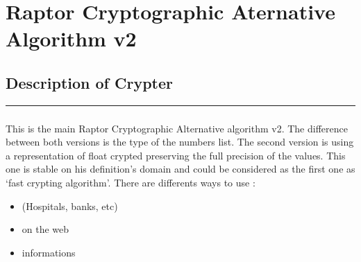 \documentclass[letterpaper,10pt,english]{sphinxmanual}
\begin{document}
\chapter{Raptor Cryptographic Aternative Algorithm v2}
\label{\detokenize{alternativev2:raptor-cryptographic-aternative-algorithm-v2}}\label{\detokenize{alternativev2::doc}}
\newpage
\section{Description of Crypter}
\label{\detokenize{Description of AltCrypterv2:description-of-crypter}}\label{\detokenize{Description of AltCrypterv2::doc}}
\sphinxAtStartPar
{}


\bigskip\hrule\bigskip



\subsection{}
\label{\detokenize{Description of AltCrypterv2:algorithm}}
\sphinxAtStartPar
This is the main Raptor Cryptographic Alternative algorithm v2.
The difference between both versions is the type of the numbers list. The second version is using
a representation of float crypted preserving the full precision of the values.
This one is stable on his definition’s domain and could be considered as the first one as ‘fast crypting algorithm’.
There are differents ways to use :
\begin{itemize}
\item {} 
\sphinxAtStartPar
{} (Hospitals, banks, etc)

\item {} 
\sphinxAtStartPar
{} on the web

\item {} 
\sphinxAtStartPar
{} informations

\end{itemize}
\end{document}
